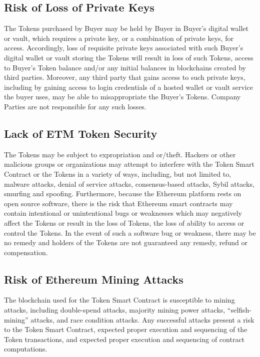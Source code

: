 \documentclass[12pt]{report}
\begin{document}
\begin{multicols}{2}
\subsection{Risk of Loss of Private Keys}
The Tokens purchased by Buyer may be held by Buyer in Buyer’s digital wallet or vault, which requires a private key, or a combination of private keys, for access. Accordingly, loss of requisite private keys associated with such Buyer’s digital wallet or vault storing the Tokens will result in loss of such Tokens, access to Buyer’s Token balance and/or any initial balances in blockchains created by third parties. Moreover, any third party that gains access to such private keys, including by gaining access to login credentials of a hosted wallet or vault service the buyer uses, may
be able to misappropriate the Buyer’s Tokens. Company Parties are not responsible for any such losses.

\subsection{Lack of ETM Token Security}
The Tokens may be subject to expropriation and or/theft. Hackers or other malicious groups or organizations may attempt to interfere with the Token Smart Contract or the Tokens in a variety of ways, including, but not limited to, malware attacks, denial of service attacks, consensus-based attacks, Sybil attacks, smurfing and spoofing.
Furthermore, because the Ethereum platform rests on open source software, there is the risk that Ethereum smart contracts may contain intentional or unintentional bugs or weaknesses which may negatively affect the Tokens or result in the loss of Tokens, the loss of ability to access or control the Tokens. In the event of such a software bug or weakness, there may be no remedy and holders of the Tokens are not guaranteed any remedy, refund or compensation.

\subsection{Risk of Ethereum Mining Attacks}
The blockchain used for the Token Smart Contract is susceptible to mining attacks, including double-spend attacks, majority mining power attacks, “selfish-mining” attacks, and race condition attacks. Any successful attacks present a risk to the Token Smart Contract, expected proper execution and sequencing of the Token transactions, and expected proper execution and sequencing of contract computations.


\end{multicols}
\end{document}
